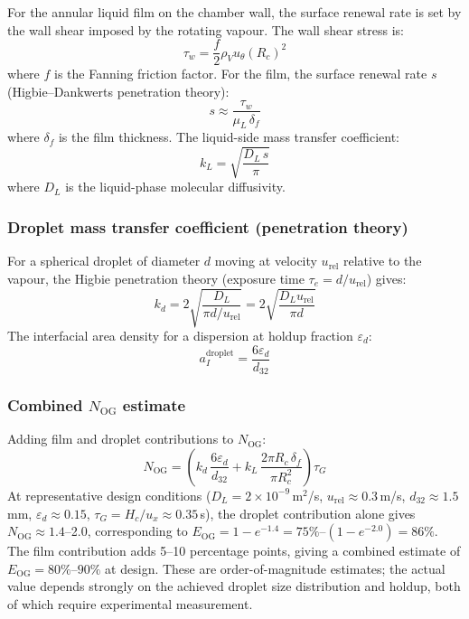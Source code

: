 \documentclass[11pt,letterpaper]{article}
\newcommand{\rhoV}{\rho_V}
\newcommand{\utheta}{u_{\theta}}
\newcommand{\ux}{u_{x}}
\newcommand{\Ntu}{N_{\mathrm{OG}}}
\newcommand{\Eog}{E_{\mathrm{OG}}}
\newcommand{\Rc}{R_c}
\newcommand{\Hc}{H_c}
\newcommand{\dsv}{d_{32}}
\begin{document}
For the annular liquid film on the chamber wall, the surface renewal rate
is set by the wall shear imposed by the rotating vapour.  The wall shear
stress is:
\begin{equation}
  \tau_w = \frac{f}{2}\rhoV\utheta(\Rc)^2
  \label{eq:tau_wall}
\end{equation}
where $f$ is the Fanning friction factor.  For the film, the surface renewal
rate $s$ (Higbie--Dankwerts penetration theory):
\begin{equation}
  s \approx \frac{\tau_w}{\mu_L\,\delta_f}
  \label{eq:renewal}
\end{equation}
where $\delta_f$ is the film thickness.  The liquid-side mass transfer
coefficient:
\begin{equation}
  k_L = \sqrt{\frac{D_L\,s}{\pi}}
  \label{eq:kl_film}
\end{equation}
where $D_L$ is the liquid-phase molecular diffusivity.

\subsubsection{Droplet mass transfer coefficient (penetration theory)}

For a spherical droplet of diameter $d$ moving at velocity $u_{\mathrm{rel}}$
relative to the vapour, the Higbie penetration theory (exposure time
$\tau_e = d/u_{\mathrm{rel}}$) gives:
\begin{equation}
  k_d = 2\sqrt{\frac{D_L}{\pi d / u_{\mathrm{rel}}}}
      = 2\sqrt{\frac{D_L u_{\mathrm{rel}}}{\pi d}}
  \label{eq:kd_droplet}
\end{equation}
The interfacial area density for a dispersion at holdup fraction
$\varepsilon_d$:
\begin{equation}
  a_I^{\mathrm{droplet}} = \frac{6\varepsilon_d}{\dsv}
  \label{eq:ai_droplet}
\end{equation}

\subsubsection{Combined $N_{\mathrm{OG}}$ estimate}

Adding film and droplet contributions to $\Ntu$:
\begin{equation}
  \Ntu = \left(k_d\,\frac{6\varepsilon_d}{\dsv}
              + k_L\,\frac{2\pi\Rc\,\delta_f}{\pi\Rc^2}\right)\tau_G
  \label{eq:ntu_combined}
\end{equation}
At representative design conditions
($D_L = 2\times10^{-9}$\,m$^2$/s,
$u_{\mathrm{rel}} \approx 0.3$\,m/s,
$\dsv \approx 1.5$\,mm,
$\varepsilon_d \approx 0.15$,
$\tau_G = \Hc/\ux \approx 0.35$\,s),
the droplet contribution alone gives
$\Ntu \approx 1.4$--2.0, corresponding to
$\Eog = 1 - e^{-1.4} = 75\%$--$(1-e^{-2.0}) = 86\%$.  The
film contribution adds 5--10 percentage points, giving a combined estimate of
$\Eog = 80\%$--$90\%$ at design.  These are order-of-magnitude estimates;
the actual value depends strongly on the achieved droplet size distribution
and holdup, both of which require experimental measurement.
\end{document}
